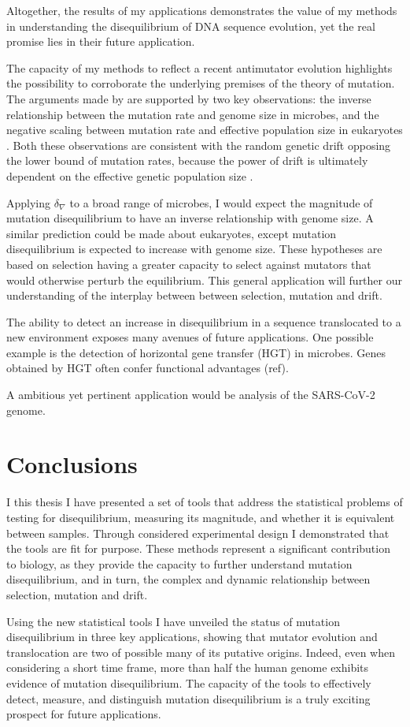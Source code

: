 Altogether, the results of my applications demonstrates the value of my methods in understanding the disequilibrium of DNA sequence evolution, yet the real promise lies in their future application.

The capacity of my methods to reflect a recent antimutator evolution highlights the possibility to corroborate the underlying premises of the theory of mutation. The arguments made by \cite{Lynch2008TheEvolution, Lynch2010EvolutionRate} are supported by two key observations: the inverse relationship between the mutation rate and genome size in microbes, and the negative scaling between mutation rate and effective population size in eukaryotes \citep{Lynch2008TheEvolution, Lynch2010EvolutionRate}. Both these observations are consistent with the random genetic drift opposing the lower bound of mutation rates, because the power of drift is ultimately dependent on the effective genetic population size \citep{Lynch2008TheEvolution, Lynch2010EvolutionRate}. 

Applying $\delta_\nabla$ to a broad range of microbes, I would expect the magnitude of mutation disequilibrium to have an inverse relationship with genome size. A similar prediction could be made about eukaryotes, except mutation disequilibrium is expected to increase with genome size. These hypotheses are based on selection having a greater capacity to select against mutators that would otherwise perturb the equilibrium. This general application will further our understanding of the interplay between between selection, mutation and drift. 
  
The ability to detect an increase in disequilibrium in a sequence translocated to a new environment exposes many avenues of future applications. One possible example is the detection of horizontal gene transfer (HGT) in microbes. Genes obtained by HGT often confer functional advantages (ref). 

A ambitious yet pertinent application would be analysis of the SARS-CoV-2 genome. 

\section{Conclusions}

I this thesis I have presented a set of tools that address the statistical problems of testing for disequilibrium, measuring its magnitude, and whether it is equivalent between samples. Through considered experimental design I demonstrated that the tools are fit for purpose. These methods represent a significant contribution to biology, as they provide the capacity to further understand mutation disequilibrium, and in turn, the complex and dynamic relationship between selection, mutation and drift. 

Using the new statistical tools I have unveiled the status of mutation disequilibrium in three key applications, showing that mutator evolution and translocation are two of possible many of its putative origins. Indeed, even when considering a short time frame, more than half the human genome exhibits evidence of mutation disequilibrium. The capacity of the tools to effectively detect, measure, and distinguish mutation disequilibrium is a truly exciting prospect for future applications. 

